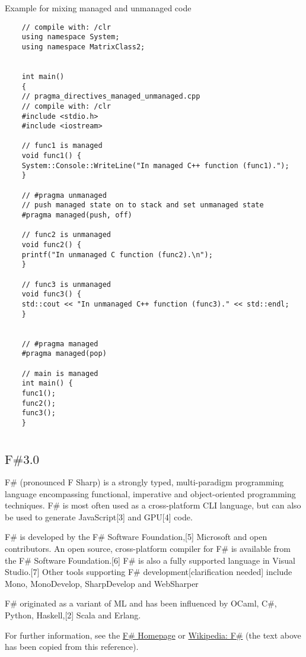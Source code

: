 	
	
	\noindent Example for mixing managed and unmanaged code 
	
	
	\begin{lstlisting}
	// compile with: /clr
	using namespace System;
	using namespace MatrixClass2;
	
	
	int main() 
	{
	// pragma_directives_managed_unmanaged.cpp
	// compile with: /clr
	#include <stdio.h>
	#include <iostream>
	
	// func1 is managed
	void func1() {
	System::Console::WriteLine("In managed C++ function (func1).");
	}
	
	// #pragma unmanaged
	// push managed state on to stack and set unmanaged state
	#pragma managed(push, off)
	
	// func2 is unmanaged
	void func2() {
	printf("In unmanaged C function (func2).\n");
	}
	
	// func3 is unmanaged
	void func3() {
	std::cout << "In unmanaged C++ function (func3)." << std::endl;
	}
	
	
	// #pragma managed
	#pragma managed(pop)
	
	// main is managed
	int main() {
	func1();
	func2();
	func3();
	}
	
	\end{lstlisting}
	
	
	
	\newpage
	\subsection{\texorpdfstring{$\text{F\# 3.0 } $}{FSharp}}
	F\# (pronounced F Sharp) is a strongly typed, multi-paradigm programming language encompassing functional, imperative and object-oriented programming techniques. F\# is most often used as a cross-platform CLI language, but can also be used to generate JavaScript[3] and GPU[4] code.
	
	F\# is developed by the F\# Software Foundation,[5] Microsoft and open contributors. An open source, cross-platform compiler for F\# is available from the F\# Software Foundation.[6] F\# is also a fully supported language in Visual Studio.[7] Other tools supporting F\# development[clarification needed] include Mono, MonoDevelop, SharpDevelop and WebSharper
	
	F\# originated as a variant of ML and has been influenced by OCaml, C\#, Python, Haskell,[2] Scala and Erlang.
	
	
	For further information, see the \href{http://fsharp.org/}{F\# Homepage} or  \href{http://en.wikipedia.org/wiki/F_Sharp_(programming_language)}{Wikipedia: F\#} (the text above has been copied from this reference).
	
